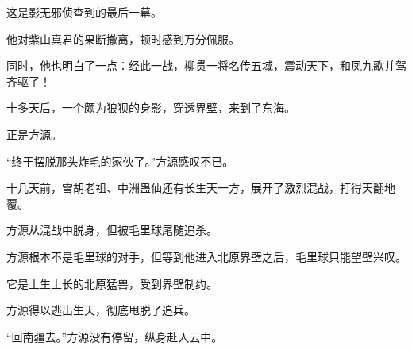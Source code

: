 \begin{this_body}
这是影无邪侦查到的最后一幕。

他对紫山真君的果断撤离，顿时感到万分佩服。

同时，他也明白了一点：经此一战，柳贯一将名传五域，震动天下，和凤九歌并驾齐驱了！

十多天后，一个颇为狼狈的身影，穿透界壁，来到了东海。

正是方源。

“终于摆脱那头炸毛的家伙了。”方源感叹不已。

十几天前，雪胡老祖、中洲蛊仙还有长生天一方，展开了激烈混战，打得天翻地覆。

方源从混战中脱身，但被毛里球尾随追杀。

方源根本不是毛里球的对手，但等到他进入北原界壁之后，毛里球只能望壁兴叹。

它是土生土长的北原猛兽，受到界壁制约。

方源得以逃出生天，彻底甩脱了追兵。

“回南疆去。”方源没有停留，纵身赴入云中。

\end{this_body}


